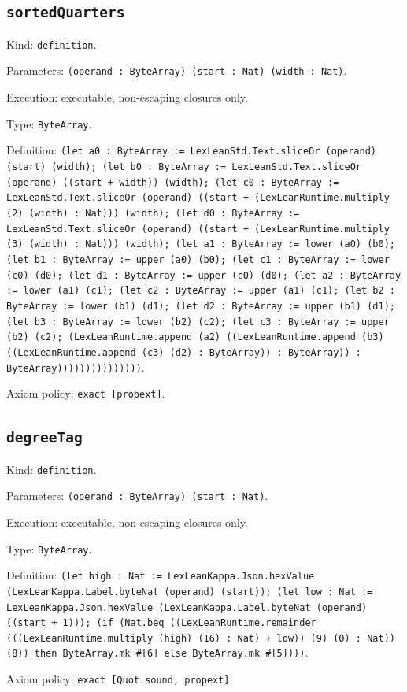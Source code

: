 \documentclass[11pt]{article}
\begin{document}
\subsection*{\texttt{sortedQuarters}}
\noindent Kind: \texttt{definition}.\par
\noindent Parameters: \texttt{(operand : ByteArray) (start : Nat) (width : Nat)}.\par
\noindent Execution: executable, non-escaping closures only.\par
\noindent Type: \texttt{ByteArray}.\par
\noindent Definition: \texttt{(let a0 : ByteArray := LexLeanStd.Text.sliceOr (operand) (start) (width); (let b0 : ByteArray := LexLeanStd.Text.sliceOr (operand) ((start + width)) (width); (let c0 : ByteArray := LexLeanStd.Text.sliceOr (operand) ((start + (LexLeanRuntime.multiply (2) (width) : Nat))) (width); (let d0 : ByteArray := LexLeanStd.Text.sliceOr (operand) ((start + (LexLeanRuntime.multiply (3) (width) : Nat))) (width); (let a1 : ByteArray := lower (a0) (b0); (let b1 : ByteArray := upper (a0) (b0); (let c1 : ByteArray := lower (c0) (d0); (let d1 : ByteArray := upper (c0) (d0); (let a2 : ByteArray := lower (a1) (c1); (let c2 : ByteArray := upper (a1) (c1); (let b2 : ByteArray := lower (b1) (d1); (let d2 : ByteArray := upper (b1) (d1); (let b3 : ByteArray := lower (b2) (c2); (let c3 : ByteArray := upper (b2) (c2); (LexLeanRuntime.append (a2) ((LexLeanRuntime.append (b3) ((LexLeanRuntime.append (c3) (d2) : ByteArray)) : ByteArray)) : ByteArray)))))))))))))))}.\par
\noindent Axiom policy: \texttt{exact [propext]}.\par
\subsection*{\texttt{degreeTag}}
\noindent Kind: \texttt{definition}.\par
\noindent Parameters: \texttt{(operand : ByteArray) (start : Nat)}.\par
\noindent Execution: executable, non-escaping closures only.\par
\noindent Type: \texttt{ByteArray}.\par
\noindent Definition: \texttt{(let high : Nat := LexLeanKappa.Json.hexValue (LexLeanKappa.Label.byteNat (operand) (start)); (let low : Nat := LexLeanKappa.Json.hexValue (LexLeanKappa.Label.byteNat (operand) ((start + 1))); (if (Nat.beq ((LexLeanRuntime.remainder (((LexLeanRuntime.multiply (high) (16) : Nat) + low)) (9) (0) : Nat)) (8)) then ByteArray.mk \#[6] else ByteArray.mk \#[5])))}.\par
\noindent Axiom policy: \texttt{exact [Quot.sound, propext]}.\par
\end{document}
